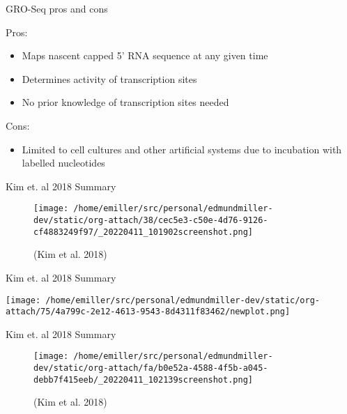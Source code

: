 \documentclass[bigger]{beamer}
\begin{document}
\begin{frame}[label={sec:orgb392d6a}]{GRO-Seq pros and cons}
\begin{block}{Pros:}
\begin{itemize}
\item Maps nascent capped 5' RNA sequence at any given time
\item Determines activity of transcription sites
\item No prior knowledge of transcription sites needed
\end{itemize}
\end{block}

\begin{block}{Cons:}
\begin{itemize}
\item Limited to cell cultures and other artificial systems due to incubation with
labelled nucleotides
\end{itemize}
\end{block}
\end{frame}

\begin{frame}[label={sec:org0babe6b}]{Kim et. al 2018 Summary}
\begin{figure}[htbp]
\centering
\texttt{[image: /home/emiller/src/personal/edmundmiller-dev/static/org-attach/38/cec5e3-c50e-4d76-9126-cf4883249f97/\_20220411\_101902screenshot.png]}
\caption[Short caption]{(Kim et al. 2018)}
\end{figure}
\end{frame}


\begin{frame}[label={sec:orgd7865a3}]{Kim et. al 2018 Summary}
\begin{center}
\texttt{[image: /home/emiller/src/personal/edmundmiller-dev/static/org-attach/75/4a799c-2e12-4613-9543-8d4311f83462/newplot.png]}
\end{center}
\end{frame}

\begin{frame}[label={sec:orgab3f8cc}]{Kim et. al 2018 Summary}
\begin{figure}[htbp]
\centering
\texttt{[image: /home/emiller/src/personal/edmundmiller-dev/static/org-attach/fa/b0e52a-4588-4f5b-a045-debb7f415eeb/\_20220411\_102139screenshot.png]}
\caption[Short caption]{(Kim et al. 2018)}
\end{figure}
\end{frame}
\end{document}
